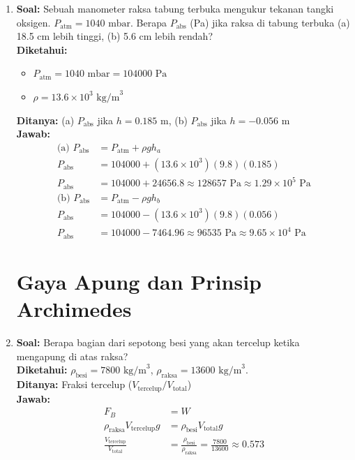 \documentclass[twocolumn]{article}
\begin{document}
\begin{enumerate}
    \item \textbf{Soal:} Sebuah manometer raksa tabung terbuka mengukur tekanan tangki oksigen. $P_{\text{atm}} = 1040 \text{ mbar}$. Berapa $P_{\text{abs}}$ (Pa) jika raksa di tabung terbuka (a) 18.5 cm lebih tinggi, (b) 5.6 cm lebih rendah? \\
    \textbf{Diketahui:}
    \begin{itemize}
        \item $P_{\text{atm}} = 1040 \text{ mbar} = 104000 \text{ Pa}$
        \item $\rho = 13.6 \times 10^3 \text{ kg/m}^3$
    \end{itemize}
    \textbf{Ditanya:} (a) $P_{\text{abs}}$ jika $h = 0.185 \text{ m}$, (b) $P_{\text{abs}}$ jika $h = -0.056 \text{ m}$ \\
    \textbf{Jawab:}
    \begin{align*}
        \text{(a) } P_{\text{abs}} &= P_{\text{atm}} + \rho g h_a \\
        P_{\text{abs}} &= 104000 + (13.6 \times 10^3)(9.8)(0.185) \\
        P_{\text{abs}} &= 104000 + 24656.8 \approx 128657 \text{ Pa} \approx 1.29 \times 10^5 \text{ Pa} \\
        \text{(b) } P_{\text{abs}} &= P_{\text{atm}} - \rho g h_b \\
        P_{\text{abs}} &= 104000 - (13.6 \times 10^3)(9.8)(0.056) \\
        P_{\text{abs}} &= 104000 - 7464.96 \approx 96535 \text{ Pa} \approx 9.65 \times 10^4 \text{ Pa}
    \end{align*}

\section*{Gaya Apung dan Prinsip Archimedes}

    \item \textbf{Soal:} Berapa bagian dari sepotong besi yang akan tercelup ketika mengapung di atas raksa? \\
    \textbf{Diketahui:} $\rho_{\text{besi}} = 7800 \text{ kg/m}^3$, $\rho_{\text{raksa}} = 13600 \text{ kg/m}^3$. \\
    \textbf{Ditanya:} Fraksi tercelup ($V_{\text{tercelup}} / V_{\text{total}}$) \\
    \textbf{Jawab:}
    \begin{align*}
        F_B &= W \\
        \rho_{\text{raksa}} V_{\text{tercelup}} g &= \rho_{\text{besi}} V_{\text{total}} g \\
        \frac{V_{\text{tercelup}}}{V_{\text{total}}} &= \frac{\rho_{\text{besi}}}{\rho_{\text{raksa}}} = \frac{7800}{13600} \approx 0.573
    \end{align*}


\end{enumerate}
\end{document}
